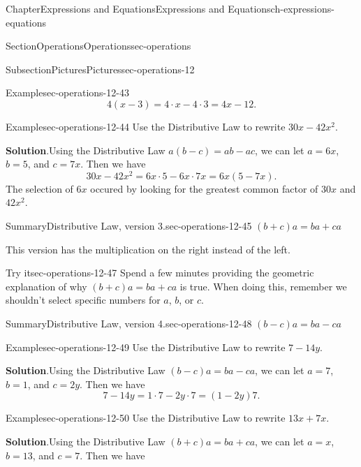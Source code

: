 \documentclass[twoside,11pt,]{book}
\newcommand{\blocktitlefont}{\relax}
\numberwithin{equation}{chapter}
\begin{document}
\begin{chapterptx}{Chapter}{Expressions and Equations}{}{Expressions and Equations}{}{}{ch-expressions-equations}
\begin{sectionptx}{Section}{Operations}{}{Operations}{}{}{sec-operations}
\begin{subsectionptx}{Subsection}{Pictures}{}{Pictures}{}{}{sec-operations-12}
\begin{example}{Example}{}{sec-operations-12-43}
\begin{equation*}
4(x - 3) = 4 \cdot x - 4 \cdot 3 = 4x - 12.
\end{equation*}
%
\end{example}
\begin{example}{Example}{}{sec-operations-12-44}%
Use the Distributive Law to rewrite \(30x - 42x^2\).%
\par\smallskip%
\noindent\textbf{\blocktitlefont Solution}.\hypertarget{sec-operations-12-44-2}{}\quad{}Using the Distributive Law \(a(b-c)=ab-ac\), we can let \(a=6x\), \(b=5\), and \(c=7x\). Then we have%
\begin{equation*}
30x - 42x^2 = 6x \cdot 5 - 6x \cdot 7x = 6x(5 - 7x).
\end{equation*}
The selection of \(6x\) occured by looking for the greatest common factor of \(30x\) and \(42x^2\).%
\end{example}
\begin{assemblage}{Summary}{Distributive Law, version 3.}{sec-operations-12-45}%
\((b+c)a=ba+ca\)%
\end{assemblage}
This version has the multiplication on the right instead of the left.%
\begin{inlineexercise}{Try it}{}{sec-operations-12-47}%
Spend a few minutes providing the geometric explanation of why \((b+c)a=ba+ca\) is true. When doing this, remember we shouldn't select specific numbers for \(a\), \(b\), or \(c\).%
\end{inlineexercise}%
\begin{assemblage}{Summary}{Distributive Law, version 4.}{sec-operations-12-48}%
\((b-c)a=ba-ca\)%
\end{assemblage}
\begin{example}{Example}{}{sec-operations-12-49}%
Use the Distributive Law to rewrite \(7 - 14y\).%
\par\smallskip%
\noindent\textbf{\blocktitlefont Solution}.\hypertarget{sec-operations-12-49-2}{}\quad{}Using the Distributive Law \((b-c)a=ba-ca\), we can let \(a=7\), \(b=1\), and \(c=2y\). Then we have%
\begin{equation*}
7 - 14y = 1 \cdot 7 - 2y \cdot 7 = (1 - 2y)7.
\end{equation*}
%
\end{example}
\begin{example}{Example}{}{sec-operations-12-50}%
Use the Distributive Law to rewrite \(13x + 7x\).%
\par\smallskip%
\noindent\textbf{\blocktitlefont Solution}.\hypertarget{sec-operations-12-50-2}{}\quad{}Using the Distributive Law \((b+c)a=ba+ca\), we can let \(a=x\), \(b=13\), and \(c=7\). Then we have%

\end{example}
\end{subsectionptx}
\end{sectionptx}
\end{chapterptx}
\end{document}
